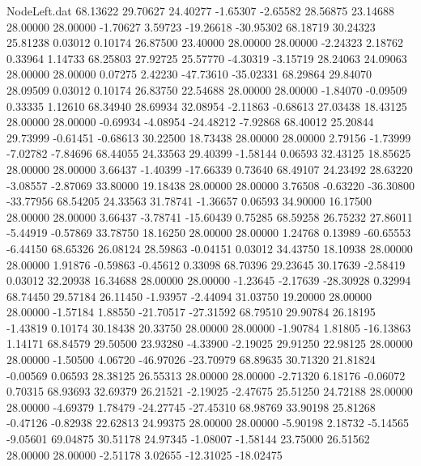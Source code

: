 \begin{filecontents}{NodeLeft.dat}
  68.13622   29.70627   24.40277    -1.65307   -2.65582   28.56875   23.14688   28.00000   28.00000   -1.70627    3.59723  -19.26618  -30.95302
  68.18719   30.24323   25.81238     0.03012    0.10174   26.87500   23.40000   28.00000   28.00000   -2.24323    2.18762    0.33964    1.14733
  68.25803   27.92725   25.57770    -4.30319   -3.15719   28.24063   24.09063   28.00000   28.00000    0.07275    2.42230  -47.73610  -35.02331
  68.29864   29.84070   28.09509     0.03012    0.10174   26.83750   22.54688   28.00000   28.00000   -1.84070   -0.09509    0.33335    1.12610
  68.34940   28.69934   32.08954    -2.11863   -0.68613   27.03438   18.43125   28.00000   28.00000   -0.69934   -4.08954  -24.48212   -7.92868
  68.40012   25.20844   29.73999    -0.61451   -0.68613   30.22500   18.73438   28.00000   28.00000    2.79156   -1.73999   -7.02782   -7.84696
  68.44055   24.33563   29.40399    -1.58144    0.06593   32.43125   18.85625   28.00000   28.00000    3.66437   -1.40399  -17.66339    0.73640
  68.49107   24.23492   28.63220    -3.08557   -2.87069   33.80000   19.18438   28.00000   28.00000    3.76508   -0.63220  -36.30800  -33.77956
  68.54205   24.33563   31.78741    -1.36657    0.06593   34.90000   16.17500   28.00000   28.00000    3.66437   -3.78741  -15.60439    0.75285
  68.59258   26.75232   27.86011    -5.44919   -0.57869   33.78750   18.16250   28.00000   28.00000    1.24768    0.13989  -60.65553   -6.44150
  68.65326   26.08124   28.59863    -0.04151    0.03012   34.43750   18.10938   28.00000   28.00000    1.91876   -0.59863   -0.45612    0.33098
  68.70396   29.23645   30.17639    -2.58419    0.03012   32.20938   16.34688   28.00000   28.00000   -1.23645   -2.17639  -28.30928    0.32994
  68.74450   29.57184   26.11450    -1.93957   -2.44094   31.03750   19.20000   28.00000   28.00000   -1.57184    1.88550  -21.70517  -27.31592
  68.79510   29.90784   26.18195    -1.43819    0.10174   30.18438   20.33750   28.00000   28.00000   -1.90784    1.81805  -16.13863    1.14171
  68.84579   29.50500   23.93280    -4.33900   -2.19025   29.91250   22.98125   28.00000   28.00000   -1.50500    4.06720  -46.97026  -23.70979
  68.89635   30.71320   21.81824    -0.00569    0.06593   28.38125   26.55313   28.00000   28.00000   -2.71320    6.18176   -0.06072    0.70315
  68.93693   32.69379   26.21521    -2.19025   -2.47675   25.51250   24.72188   28.00000   28.00000   -4.69379    1.78479  -24.27745  -27.45310
  68.98769   33.90198   25.81268    -0.47126   -0.82938   22.62813   24.99375   28.00000   28.00000   -5.90198    2.18732   -5.14565   -9.05601
  69.04875   30.51178   24.97345    -1.08007   -1.58144   23.75000   26.51562   28.00000   28.00000   -2.51178    3.02655  -12.31025  -18.02475

\end{filecontents}
